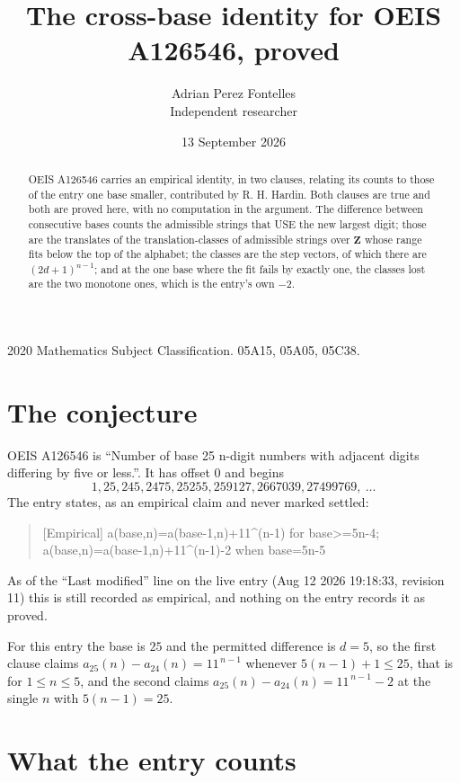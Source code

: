 \documentclass[11pt,a4paper]{article}
\title{The cross-base identity for OEIS A126546, proved}
\author{Adrian Perez Fontelles\\ \small Independent researcher}
\date{13 September 2026}
\theoremstyle{plain}
\theoremstyle{definition}
\begin{document}
\maketitle

\begin{abstract}
OEIS A126546 carries an empirical identity, in two clauses, relating its counts to those of the
entry one base smaller, contributed by R. H. Hardin. Both clauses are true and both are proved
here, with no computation in the argument. The difference between consecutive bases counts the
admissible strings that USE the new largest digit; those are the translates of the
translation-classes of admissible strings over $\mathbf{Z}$ whose range fits below the top of
the alphabet; the classes are the step vectors, of which there are $(2d+1)^{n-1}$; and at the
one base where the fit fails by exactly one, the classes lost are the two monotone ones, which
is the entry's own $-2$.
\end{abstract}

\noindent\small 2020 Mathematics Subject Classification. 05A15, 05A05, 05C38.\normalsize

\section{The conjecture}

OEIS A126546 is ``Number of base 25 n-digit numbers with adjacent digits differing by five or less.''. It has offset $0$ and begins
\[
1, 25, 245, 2475, 25255, 259127, 2667039, 27499769,\ \dots
\]
The entry states, as an empirical claim and never marked settled:
\begin{quote}
[Empirical] a(base,n)=a(base-1,n)+11\textasciicircum{}(n-1) for base>=5n-4; a(base,n)=a(base-1,n)+11\textasciicircum{}(n-1)-2 when base=5n-5
\end{quote}
As of the ``Last modified'' line on the live entry (Aug 12 2026 19:18:33, revision 11)
this is still recorded as empirical, and nothing on the entry records it as proved.

For this entry the base is $25$ and the permitted difference is $d=5$, so the first clause
claims $a_{25}(n)-a_{24}(n)=11^{\,n-1}$ whenever $5(n-1)+1\le25$, that is for
$1\le n\le5$, and the second claims $a_{25}(n)-a_{24}(n)=11^{\,n-1}-2$ at the single
$n$ with $5(n-1)=25$.

\section{What the entry counts}
\end{document}
